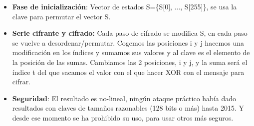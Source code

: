 \documentclass[12pt, twoside, openright]{report} %
\begin{document}
\begin{itemize}
\begin{itemize}
      \begin{itemize}
      \item \textbf{Fase de inicialización}: Vector de estados S=\{S{[}0{]},
        ..., S{[}255{]}\}, se usa la clave para permutar el vector S.
        
      \item \textbf{Serie cifrante y cifrado:} Cada paso de cifrado se
        modifica S, en cada paso se vuelve a desordenar/permutar.
        Cogemos las posiciones i y j hacemos una modificación en los
        índices y sumamos sus valores y al clave es el elemento de la
        posición de las sumas. Cambiamos las 2 posiciones, i y j, y la
        suma será el índice t del que sacamos el valor con el que hacer
        XOR con el mensaje para cifrar.
        
      \item \textbf{Seguridad}: El resultado es no-lineal, ningún ataque
        práctico había dado resultados con claves de tamaños razonables
        (128 bits o más) hasta 2015. Y desde ese momento se ha prohibido
        su uso, para usar otros más seguros.
        
      \end{itemize}
    \end{itemize}
  \end{itemize}
\end{document}
